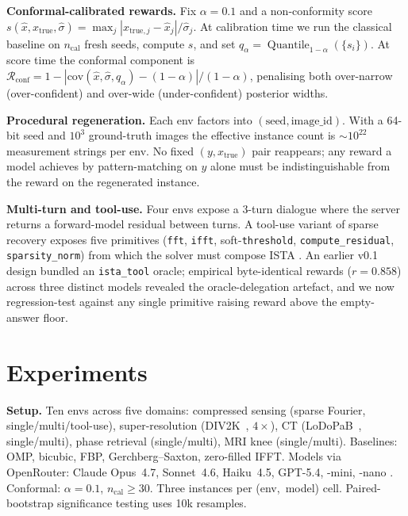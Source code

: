 \documentclass{article}
\begin{document}
\textbf{Conformal-calibrated rewards.} Fix $\alpha{=}0.1$ and a
non-conformity score
$s(\hat{x}, x_{\mathrm{true}}, \hat{\sigma}){=}
\max_j |x_{\mathrm{true},j}{-}\hat{x}_j|/\hat{\sigma}_j$. At calibration
time we run the classical baseline on $n_{\mathrm{cal}}$ fresh seeds,
compute $s$, and set
$q_{\alpha}{=}\operatorname{Quantile}_{1-\alpha}(\{s_i\})$. At score
time the conformal component is
$\mathcal{R}_{\mathrm{conf}}{=}1{-}|\mathrm{cov}(\hat{x}, \hat{\sigma},
q_{\alpha}){-}(1{-}\alpha)|/(1{-}\alpha)$, penalising both over-narrow
(over-confident) and over-wide (under-confident) posterior widths.

\textbf{Procedural regeneration.} Each env factors into
$(\mathrm{seed}, \mathrm{image\_id})$. With a 64-bit seed and
$10^{3}$ ground-truth images the effective instance count is
$\sim\!10^{22}$ measurement strings per env. No fixed
$(y, x_{\mathrm{true}})$ pair reappears; any reward a model achieves
by pattern-matching on $y$ alone must be indistinguishable from the
reward on the regenerated instance.

\textbf{Multi-turn and tool-use.} Four envs expose a 3-turn dialogue
where the server returns a forward-model residual between turns. A
tool-use variant of sparse recovery exposes five primitives
(\texttt{fft}, \texttt{ifft}, soft-\texttt{threshold},
\texttt{compute\_residual}, \texttt{sparsity\_norm}) from which the
solver must compose ISTA \citep{daubechies2004iterative}. An earlier v0.1 design bundled an
\texttt{ista\_tool} oracle; empirical byte-identical rewards
($r{=}0.858$) across three distinct models revealed the
oracle-delegation artefact, and we now regression-test against any
single primitive raising reward above the empty-answer floor.

\vspace{-3pt}
\section{Experiments}
\vspace{-2pt}

\textbf{Setup.} Ten envs across five domains: compressed sensing
(sparse Fourier, single/multi/tool-use), super-resolution
(DIV2K~\citep{agustsson2017ntire}, $4{\times}$), CT
(LoDoPaB~\citep{leuschner2021lodopab}, single/multi), phase retrieval
(single/multi), MRI knee (single/multi). Baselines: OMP, bicubic,
FBP, Gerchberg--Saxton, zero-filled IFFT. Models via OpenRouter:
Claude Opus~4.7, Sonnet~4.6, Haiku~4.5, GPT-5.4, -mini, -nano
\citep{anthropic2025claude4, openai2025gpt5}. Conformal:
$\alpha{=}0.1$, $n_{\mathrm{cal}}{\ge}30$. Three instances per
(env,~model) cell. Paired-bootstrap significance testing uses 10k
resamples.
\end{document}
